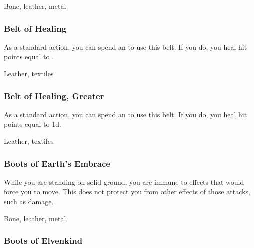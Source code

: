  


 Bone, leather, metal


\lowercase{\hypertarget{item:Belt of Healing}{}}\label{item:Belt of Healing}
\hypertarget{item:Belt of Healing}{\subsubsection{Belt of Healing\hfill{}}}

As a standard action, you can spend an  to use this belt.
If you do, you heal hit points equal to .



 


 Leather, textiles


\lowercase{\hypertarget{item:Belt of Healing, Greater}{}}\label{item:Belt of Healing, Greater}
\hypertarget{item:Belt of Healing, Greater}{\subsubsection{Belt of Healing, Greater\hfill{}}}

As a standard action, you can spend an  to use this belt.
If you do, you heal hit points equal to  \plus1d.



 


 Leather, textiles


\lowercase{\hypertarget{item:Boots of Earth's Embrace}{}}\label{item:Boots of Earth's Embrace}
\hypertarget{item:Boots of Earth's Embrace}{\subsubsection{Boots of Earth's Embrace\hfill{}}}

While you are standing on solid ground, you are immune to effects that would force you to move.
This does not protect you from other effects of those attacks, such as damage.



 


 Bone, leather, metal


\lowercase{\hypertarget{item:Boots of Elvenkind}{}}\label{item:Boots of Elvenkind}
\hypertarget{item:Boots of Elvenkind}{\subsubsection{Boots of Elvenkind\hfill{}}}

